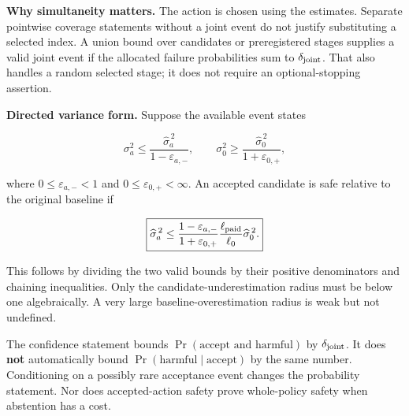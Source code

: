 \textbf{Why simultaneity matters.} The action is chosen using the estimates. Separate pointwise coverage statements without a joint event do not justify substituting a selected index. A union bound over candidates or preregistered stages supplies a valid joint event if the allocated failure probabilities sum to $\delta_{\rm joint}$. That also handles a random selected stage; it does not require an optional-stopping assertion.


\textbf{Directed variance form.} Suppose the available event states


\begin{equation}
\sigma_a^2\le\frac{\widehat\sigma_a^{\,2}}{1-\varepsilon_{a,-}},\qquad
\sigma_0^2\ge\frac{\widehat\sigma_0^{\,2}}{1+\varepsilon_{0,+}},
\end{equation}


where $0\le\varepsilon_{a,-}<1$ and $0\le\varepsilon_{0,+}<\infty$. An accepted candidate is safe relative to the original baseline if


\begin{equation}
\boxed{\widehat\sigma_a^{\,2}\le
\frac{1-\varepsilon_{a,-}}{1+\varepsilon_{0,+}}
\frac{\ell_{\rm paid}}{\ell_0}\widehat\sigma_0^{\,2}.}
\end{equation}


This follows by dividing the two valid bounds by their positive denominators and chaining inequalities. Only the candidate-underestimation radius must be below one algebraically. A very large baseline-overestimation radius is weak but not undefined.


The confidence statement bounds $\Pr(\text{accept and harmful})$ by $\delta_{\rm joint}$. It does \textbf{not} automatically bound $\Pr(\text{harmful}\mid\text{accept})$ by the same number. Conditioning on a possibly rare acceptance event changes the probability statement. Nor does accepted-action safety prove whole-policy safety when abstention has a cost.

